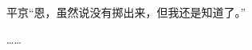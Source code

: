 \documentclass{article}
\begin{document}
平京“恩，虽然说没有掷出来，但我还是知道了。”

……



























\end{document}
